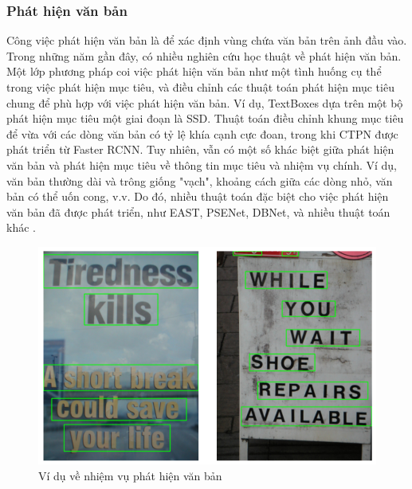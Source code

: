 \subsubsection{Phát hiện văn bản}
Công việc phát hiện văn bản là để xác định vùng chứa văn bản trên ảnh đầu vào. Trong những năm gần đây, có nhiều nghiên cứu học thuật về phát hiện văn bản. Một lớp phương pháp coi việc phát hiện văn bản như một tình huống cụ thể trong việc phát hiện mục tiêu, và điều chỉnh các thuật toán phát hiện mục tiêu chung để phù hợp với việc phát hiện văn bản. Ví dụ, TextBoxes dựa trên một bộ phát hiện mục tiêu một giai đoạn là SSD. Thuật toán điều chỉnh khung mục tiêu để vừa với các dòng văn bản có tỷ lệ khía cạnh cực đoan, trong khi CTPN được phát triển từ Faster RCNN. Tuy nhiên, vẫn có một số khác biệt giữa phát hiện văn bản và phát hiện mục tiêu về thông tin mục tiêu và nhiệm vụ chính. Ví dụ, văn bản thường dài và trông giống "vạch", khoảng cách giữa các dòng nhỏ, văn bản có thể uốn cong, v.v. Do đó, nhiều thuật toán đặc biệt cho việc phát hiện văn bản đã được phát triển, như EAST, PSENet, DBNet, và nhiều thuật toán khác \cite{Dive-into-ocr-2022}.
\begin{figure}
    \includegraphics[scale=0.7]{images/text-detection.png}
    \centering
    \caption{Ví dụ về nhiệm vụ phát hiện văn bản}
\end{figure}

